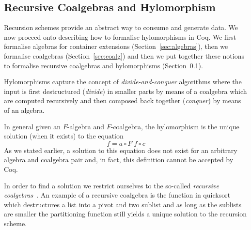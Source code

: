 \documentclass{llncs}
\begin{document}
\subsection{Recursive Coalgebras and Hylomorphism}
\label{sec:rec-coalgebras}
Recursion schemes provide an abstract way to consume and generate data. We now
proceed onto describing how to formalise hylomorphisms in Coq. We first
formalise algebras for container extensions (Section~\ref{sec:algebras}), then
we formalise coalgebras (Section~\ref{sec:coalg}) and then we put together these
notions to formalise recursive coalgebras and hylomorphisms
(Section~\ref{sec:rec-coalgebras}).



Hylomorphisms capture the concept of \emph{divide-and-conquer} algorithms where
the input is first destructured (\emph{divide}) in smaller parts by means of a
coalgebra which are computed recursively and then composed back together
(\emph{conquer}) by means of an algebra.

In general given an $F$-algebra and $F$-coalgebra, the hylomorphism is the
unique solution (when it exists) to the equation
\begin{equation}
  \label{eq:hylo}
  f = a \circ F\; f \circ c
\end{equation}
As we stated earlier, a solution to this equation does not exist for an
arbitrary  algebra and coalgebra pair and, in fact, this definition cannot be
accepted by Coq.

In order to find a solution we restrict ourselves to the so-called
\emph{recursive coalgebras}~\cite{AdamekMM19,CaprettaUV04}.  An example of a
recursive coalgebra is the  function in quicksort which
destructures a list into a pivot and two sublist and as long as the sublists are
smaller the partitioning function still yields a unique solution to the
recursion scheme.
\end{document}
